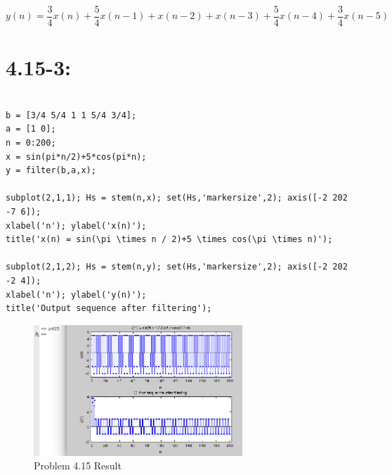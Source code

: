 \documentclass[11pt
  , a4paper
  , article
  , oneside
]{memoir}
\begin{document}
\begin {equation}
y(n)=\frac{3}{4}x(n)+\frac{5}{4}x(n-1)+x(n-2)+x(n-3)+\frac{5}{4}x(n-4)+\frac{3}{4}x(n-5)
\end {equation}

\section{4.15-3: }


\begin{lstlisting}[style=termstyle]
%Problem 4.15

b = [3/4 5/4 1 1 5/4 3/4]; 
a = [1 0];
n = 0:200; 
x = sin(pi*n/2)+5*cos(pi*n); 
y = filter(b,a,x);

subplot(2,1,1); Hs = stem(n,x); set(Hs,'markersize',2); axis([-2 202 -7 6]);
xlabel('n'); ylabel('x(n)');
title('x(n) = sin(\pi \times n / 2)+5 \times cos(\pi \times n)');

subplot(2,1,2); Hs = stem(n,y); set(Hs,'markersize',2); axis([-2 202 -2 4]);
xlabel('n'); ylabel('y(n)');
title('Output sequence after filtering');
\end{lstlisting}

\begin{figure}[h!]
	\centering
	\includegraphics[width=0.7\textwidth,height=0.4\textwidth]{./images/p415.png}
	\caption{Problem 4.15 Result}
	\label{fig:Problem 4.15 Result}
\end{figure}
\end{document}
